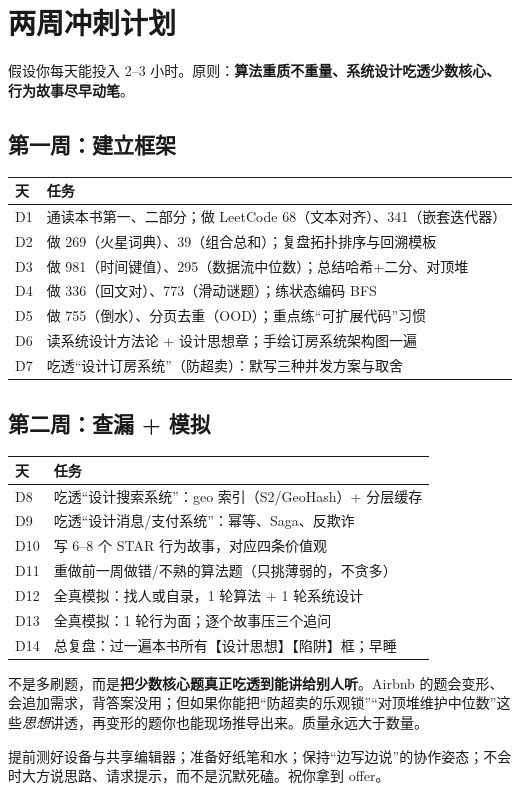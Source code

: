 \section{两周冲刺计划}

假设你每天能投入 2--3 小时。原则：\textbf{算法重质不重量、系统设计吃透少数核心、行为故事尽早动笔}。

\subsection{第一周：建立框架}

\begin{center}
\begin{tabularx}{\linewidth}{@{}l X@{}}
\toprule
\textbf{天} & \textbf{任务} \\
\midrule
D1 & 通读本书第一、二部分；做 LeetCode 68（文本对齐）、341（嵌套迭代器） \\
D2 & 做 269（火星词典）、39（组合总和）；复盘拓扑排序与回溯模板 \\
D3 & 做 981（时间键值）、295（数据流中位数）；总结哈希+二分、对顶堆 \\
D4 & 做 336（回文对）、773（滑动谜题）；练状态编码 BFS \\
D5 & 做 755（倒水）、分页去重（OOD）；重点练“可扩展代码”习惯 \\
D6 & 读系统设计方法论 + 设计思想章；手绘订房系统架构图一遍 \\
D7 & 吃透“设计订房系统”（防超卖）：默写三种并发方案与取舍 \\
\bottomrule
\end{tabularx}
\end{center}

\subsection{第二周：查漏 + 模拟}

\begin{center}
\begin{tabularx}{\linewidth}{@{}l X@{}}
\toprule
\textbf{天} & \textbf{任务} \\
\midrule
D8  & 吃透“设计搜索系统”：geo 索引（S2/GeoHash）+ 分层缓存 \\
D9  & 吃透“设计消息/支付系统”：幂等、Saga、反欺诈 \\
D10 & 写 6--8 个 STAR 行为故事，对应四条价值观 \\
D11 & 重做前一周做错/不熟的算法题（只挑薄弱的，不贪多） \\
D12 & 全真模拟：找人或自录，1 轮算法 + 1 轮系统设计 \\
D13 & 全真模拟：1 轮行为面；逐个故事压三个追问 \\
D14 & 总复盘：过一遍本书所有【设计思想】【陷阱】框；早睡 \\
\bottomrule
\end{tabularx}
\end{center}

\begin{idea}[冲刺期最重要的一件事]
不是多刷题，而是\textbf{把少数核心题真正吃透到能讲给别人听}。Airbnb 的题会变形、会追加需求，背答案没用；但如果你能把“防超卖的乐观锁”“对顶堆维护中位数”这些\emph{思想}讲透，再变形的题你也能现场推导出来。质量永远大于数量。
\end{idea}

\begin{keypoint}[面试当天]
提前测好设备与共享编辑器；准备好纸笔和水；保持“边写边说”的协作姿态；不会时大方说思路、请求提示，而不是沉默死磕。祝你拿到 offer。
\end{keypoint}
